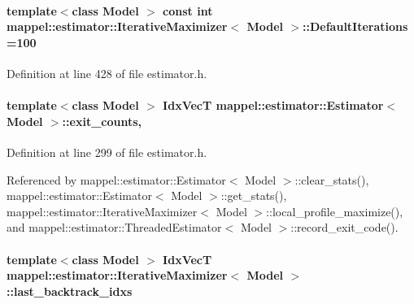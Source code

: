 \paragraph[{\texorpdfstring{Default\+Iterations}{DefaultIterations}}]{\setlength{\rightskip}{0pt plus 5cm}template$<$class Model $>$ const int {\bf mappel\+::estimator\+::\+Iterative\+Maximizer}$<$ Model $>$\+::Default\+Iterations =100\hspace{0.3cm}{\ttfamily [static]}}\hypertarget{classmappel_1_1estimator_1_1IterativeMaximizer_ab66c01c2eee630f3fca119f3fe09a19a}{}\label{classmappel_1_1estimator_1_1IterativeMaximizer_ab66c01c2eee630f3fca119f3fe09a19a}


Definition at line 428 of file estimator.\+h.

\paragraph[{\texorpdfstring{exit\+\_\+counts}{exit_counts}}]{\setlength{\rightskip}{0pt plus 5cm}template$<$class Model $>$ {\bf Idx\+VecT} {\bf mappel\+::estimator\+::\+Estimator}$<$ Model $>$\+::exit\+\_\+counts\hspace{0.3cm}{\ttfamily [protected]}, {\ttfamily [inherited]}}\hypertarget{classmappel_1_1estimator_1_1Estimator_aa946d9789a1299d684f83a822a10caa7}{}\label{classmappel_1_1estimator_1_1Estimator_aa946d9789a1299d684f83a822a10caa7}


Definition at line 299 of file estimator.\+h.



Referenced by mappel\+::estimator\+::\+Estimator$<$ Model $>$\+::clear\+\_\+stats(), mappel\+::estimator\+::\+Estimator$<$ Model $>$\+::get\+\_\+stats(), mappel\+::estimator\+::\+Iterative\+Maximizer$<$ Model $>$\+::local\+\_\+profile\+\_\+maximize(), and mappel\+::estimator\+::\+Threaded\+Estimator$<$ Model $>$\+::record\+\_\+exit\+\_\+code().

\paragraph[{\texorpdfstring{last\+\_\+backtrack\+\_\+idxs}{last_backtrack_idxs}}]{\setlength{\rightskip}{0pt plus 5cm}template$<$class Model $>$ {\bf Idx\+VecT} {\bf mappel\+::estimator\+::\+Iterative\+Maximizer}$<$ Model $>$\+::last\+\_\+backtrack\+\_\+idxs\hspace{0.3cm}{\ttfamily [protected]}}\hypertarget{classmappel_1_1estimator_1_1IterativeMaximizer_aae10373b4dc244c435059bbc6b0d9704}{}\label{classmappel_1_1estimator_1_1IterativeMaximizer_aae10373b4dc244c435059bbc6b0d9704}


